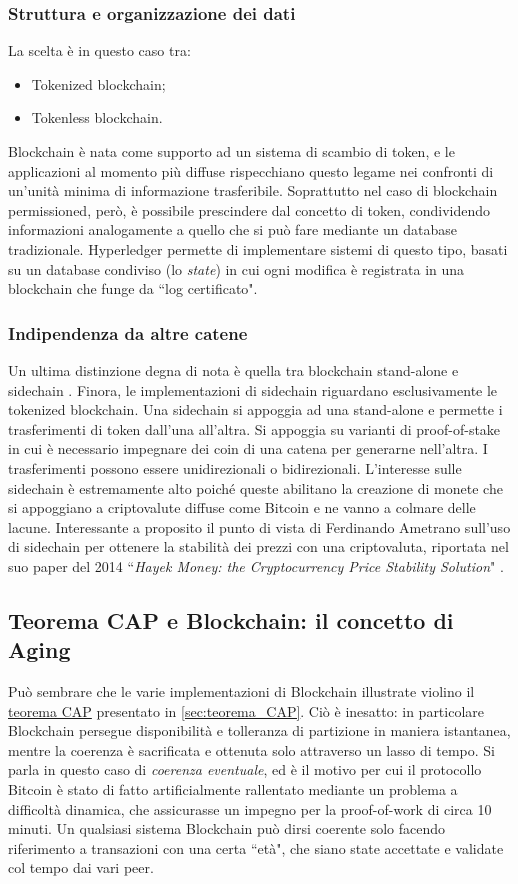 		\subsubsection{Struttura e organizzazione dei dati}
			La scelta è in questo caso tra:
			\begin{itemize}
				\item Tokenized blockchain;
				\item Tokenless blockchain.
			\end{itemize}
			Blockchain è nata come supporto ad un sistema di scambio di token, e le applicazioni al momento più diffuse rispecchiano questo legame nei confronti di un'unità minima di informazione trasferibile. Soprattutto nel caso di blockchain permissioned, però, è possibile prescindere dal concetto di token, condividendo informazioni analogamente a quello che si può fare mediante un database tradizionale. Hyperledger permette di implementare sistemi di questo tipo, basati su un database condiviso (lo \emph{state}) in cui ogni modifica è registrata in una blockchain che funge da ``log certificato".
		
		\subsubsection{Indipendenza da altre catene}
			Un ultima distinzione degna di nota è quella tra blockchain stand-alone e sidechain \cite{sidechain}. Finora, le implementazioni di sidechain riguardano esclusivamente le tokenized blockchain. Una sidechain si appoggia ad una stand-alone e permette i trasferimenti di token dall'una all'altra. Si appoggia su varianti di proof-of-stake in cui è necessario impegnare dei coin di una catena per generarne nell'altra. I trasferimenti possono essere unidirezionali o bidirezionali. L'interesse sulle sidechain è estremamente alto poiché queste abilitano la creazione di monete che si appoggiano a criptovalute diffuse come Bitcoin e ne vanno a colmare delle lacune. Interessante a proposito il punto di vista di Ferdinando Ametrano sull'uso di sidechain per ottenere la stabilità dei prezzi con una criptovaluta, riportata nel suo paper del 2014 ``\emph{Hayek Money: the Cryptocurrency Price Stability Solution}" \cite{hayek_money}.

	\subsection{Teorema CAP e Blockchain: il concetto di Aging}
		Può sembrare che le varie implementazioni di Blockchain illustrate violino il \hyperref[sec:teorema_CAP]{teorema CAP} presentato in \ref{sec:teorema_CAP}. Ciò è inesatto: in particolare Blockchain persegue disponibilità e tolleranza di partizione in maniera istantanea, mentre la coerenza è sacrificata e ottenuta solo attraverso un lasso di tempo. Si parla in questo caso di \emph{coerenza eventuale}, ed è il motivo per cui il protocollo Bitcoin è stato di fatto artificialmente rallentato mediante un problema a difficoltà dinamica, che assicurasse un impegno per la proof-of-work di circa 10 minuti. Un qualsiasi sistema Blockchain può dirsi coerente solo facendo riferimento a transazioni con una certa ``età", che siano state accettate e validate col tempo dai vari peer.

